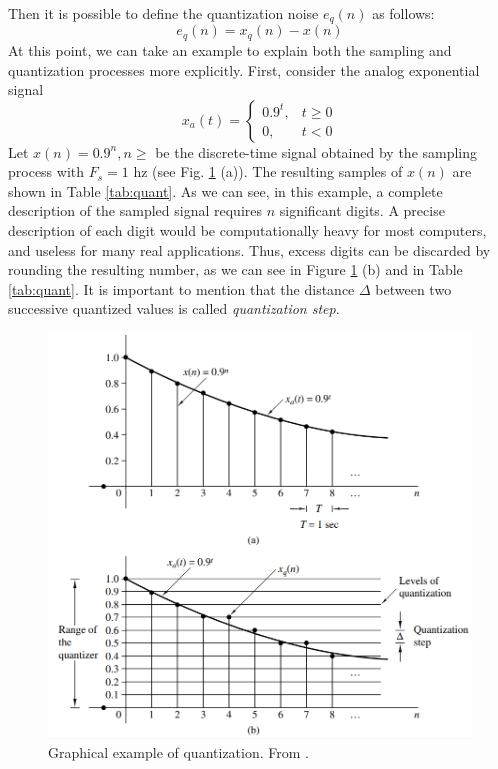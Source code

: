 \noindent Then it is possible to define the quantization noise $e_{q}(n)$ as follows: 
\begin{equation}\label{eq:quant_noise}
	e_{q}(n)=x_{q}(n)-x(n)
\end{equation}
At this point, we can take an example to explain both the sampling and quantization processes more explicitly. First, consider the analog exponential signal
$$
x_a(t)=\left\{\begin{array}{ll}
	0.9^{t}, & t \geq 0 \\
	0, & t<0
\end{array}\right.
$$
\noindent Let $x(n) = 0.9^{n}, n \geq $ be the discrete-time signal obtained by the sampling process with $F_s = 1$ \gls{hz} (see Fig. \ref{fig:quantization} (a)). The resulting samples of $x(n)$ are shown in Table \ref{tab:quant}. As we can see, in this example, a complete description of the sampled signal requires $n$ significant digits. A precise description of each digit would be computationally heavy for most computers, and useless for many real applications. Thus, excess digits can be discarded by rounding the resulting number, as we can see in Figure \ref{fig:quantization} (b) and in Table \ref{tab:quant}. It is important to mention that the distance $\Delta$ between two successive quantized values is called \textit{quantization step}. 
\begin{figure}[]
	\begin{center}
		\includegraphics[scale=0.8]{img/quantization.png}
		\captionsetup{margin=2cm}
		\caption{Graphical example of quantization. From \cite{proakis2006dimitris}.} 
		\label{fig:quantization}
	\end{center}
\end{figure}

